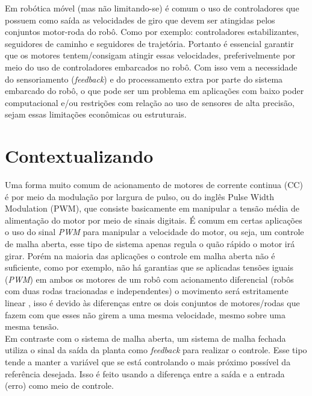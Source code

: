Em robótica móvel (mas não limitando-se) é comum o uso de controladores que possuem como saída as velocidades de giro que devem ser atingidas pelos conjuntos motor-roda do robô. Como por exemplo: controladores estabilizantes, seguidores de caminho e seguidores de trajetória. Portanto é essencial garantir que os motores tentem/consigam atingir essas velocidades, preferivelmente por meio do uso de controladores embarcados no robô. Com isso vem a necessidade do sensoriamento (\emph{feedback}) e do processamento extra por parte do sistema embarcado do robô, o que pode ser um problema em aplicações com baixo poder computacional e/ou restrições com relação ao uso de sensores de alta precisão, sejam essas limitações econômicas ou estruturais.\\

\section{Contextualizando}
\label{sec:contextualizando}
Uma forma muito comum de acionamento de motores de corrente continua (CC) é por meio da modulação por largura de pulso, ou do inglês Pulse Width Modulation (PWM), que consiste basicamente em manipular a tensão média de alimentação do motor por meio de sinais digitais. É comum em certas aplicações o uso do sinal \emph{PWM} para manipular a velocidade do motor, ou seja, um controle de malha aberta, esse tipo de sistema apenas regula o quão rápido o motor irá girar. Porém na maioria das aplicações o controle em malha aberta não é suficiente, como por exemplo, não há garantias que se aplicadas tensões iguais (\emph{PWM}) em ambos os motores de um robô com acionamento diferencial (robôs com duas rodas tracionadas e independentes) o movimento será estritamente linear \cite{simple_speed_feedback}, isso é devido às diferenças entre os dois conjuntos de motores/rodas que fazem com que esses não girem a uma mesma velocidade, mesmo sobre uma mesma tensão.\\

Em contraste com o sistema de malha aberta, um sistema de malha fechada utiliza o sinal da saída da planta como \emph{feedback} para realizar o controle. Esse tipo tende a manter a variável que se está controlando o mais próximo possível da referência desejada. Isso é feito usando a diferença entre a saída e a entrada (erro) como meio de controle. \\ %

